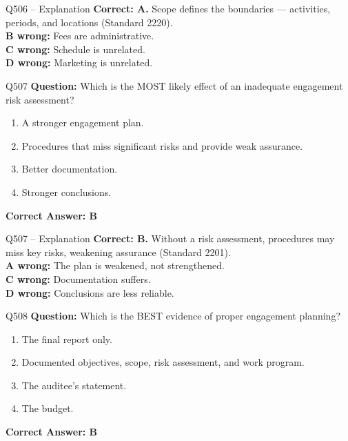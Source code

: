 \documentclass[aspectratio=169,10pt]{beamer}
\begin{document}
	\begin{frame}[t]{Q506 -- Explanation}
		\small
		\textbf{Correct: A.} Scope defines the boundaries — activities, periods, and locations (Standard 2220). \\[4pt]
		\textbf{B wrong:} Fees are administrative. \\[2pt]
		\textbf{C wrong:} Schedule is unrelated. \\[2pt]
		\textbf{D wrong:} Marketing is unrelated.
	\end{frame}
	
	\begin{frame}[t]{Q507}
		\small
		\textbf{Question:} Which is the MOST likely effect of an inadequate engagement risk assessment?
		\begin{enumerate}[label=\Alph*.,itemsep=1pt,topsep=2pt]
			\item A stronger engagement plan.
			\item Procedures that miss significant risks and provide weak assurance.
			\item Better documentation.
			\item Stronger conclusions.
		\end{enumerate}
		\vspace{4pt}
		\textbf{Correct Answer: B}
	\end{frame}
	
	\begin{frame}[t]{Q507 -- Explanation}
		\small
		\textbf{Correct: B.} Without a risk assessment, procedures may miss key risks, weakening assurance (Standard 2201). \\[4pt]
		\textbf{A wrong:} The plan is weakened, not strengthened. \\[2pt]
		\textbf{C wrong:} Documentation suffers. \\[2pt]
		\textbf{D wrong:} Conclusions are less reliable.
	\end{frame}
	
	\begin{frame}[t]{Q508}
		\small
		\textbf{Question:} Which is the BEST evidence of proper engagement planning?
		\begin{enumerate}[label=\Alph*.,itemsep=1pt,topsep=2pt]
			\item The final report only.
			\item Documented objectives, scope, risk assessment, and work program.
			\item The auditee's statement.
			\item The budget.
		\end{enumerate}
		\vspace{4pt}
		\textbf{Correct Answer: B}
	\end{frame}
	
\end{document}
